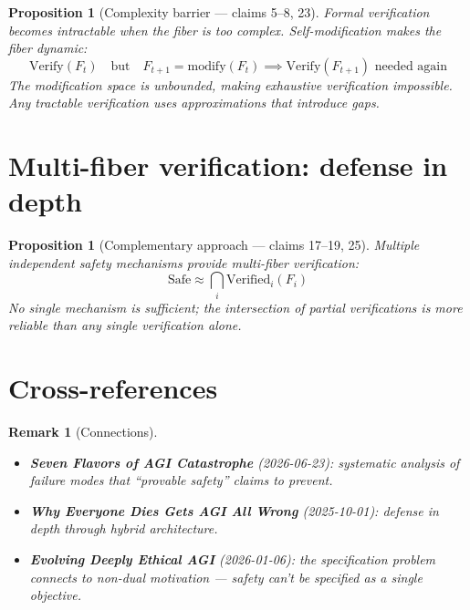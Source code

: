 \documentclass[11pt,a4paper]{article}
\newtheorem{proposition}[definition]{Proposition}
\newtheorem{remark}[definition]{Remark}
\begin{document}
\begin{proposition}[Complexity barrier --- claims 5--8, 23]
Formal verification becomes intractable when the fiber is too complex.
Self-modification makes the fiber dynamic:
\[
  \text{Verify}(F_t) \quad \text{but} \quad F_{t+1} = \text{modify}(F_t)
  \implies \text{Verify}(F_{t+1}) \text{ needed again}
\]
The modification space is unbounded, making exhaustive verification
impossible. Any tractable verification uses approximations that
introduce gaps.
\end{proposition}

\section{Multi-fiber verification: defense in depth}

\begin{proposition}[Complementary approach --- claims 17--19, 25]
Multiple independent safety mechanisms provide multi-fiber verification:
\[
  \text{Safe} \approx \bigcap_i \text{Verified}_i(F_i)
\]
No single mechanism is sufficient; the intersection of partial
verifications is more reliable than any single verification alone.
\end{proposition}

\section{Cross-references}

\begin{remark}[Connections]
\begin{itemize}
\item \textbf{Seven Flavors of AGI Catastrophe} (2026-06-23): systematic
  analysis of failure modes that ``provable safety'' claims to prevent.
\item \textbf{Why Everyone Dies Gets AGI All Wrong} (2025-10-01): defense
  in depth through hybrid architecture.
\item \textbf{Evolving Deeply Ethical AGI} (2026-01-06): the specification
  problem connects to non-dual motivation --- safety can't be specified
  as a single objective.
\end{itemize}
\end{remark}
\end{document}
